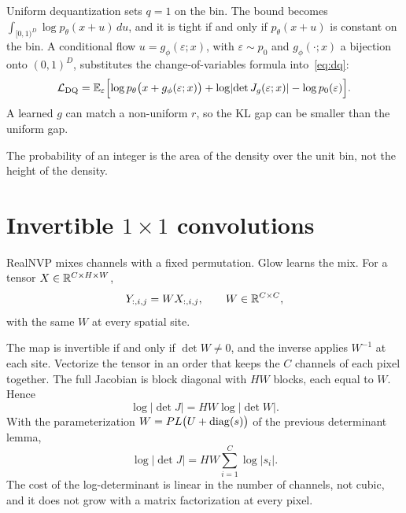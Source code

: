 Uniform dequantization sets $q=1$ on the bin. The bound becomes $\int_{[0,1)^D}\log p_\theta(x+u)\,du$, and it is tight if and only if $p_\theta(x+u)$ is constant on the bin. A conditional flow $u=g_\phi(\varepsilon;x)$, with $\varepsilon\sim p_0$ and $g_\phi(\cdot;x)$ a bijection onto $(0,1)^D$, substitutes the change-of-variables formula into~\eqref{eq:dq}:
\[
\mathcal L_{\mathrm{DQ}}
=\mathbb{E}_{\varepsilon}\Bigl[
\log p_\theta\bigl(x+g_\phi(\varepsilon;x)\bigr)
+\log\lvert\det J_{g}(\varepsilon;x)\rvert
-\log p_0(\varepsilon)
\Bigr].
\]
A learned $g$ can match a non-uniform $r$, so the KL gap can be smaller than the uniform gap.

\begin{center}
\end{center}
\begin{center}
\textcolor{muted}{\small The probability of an integer is the area of the density over the unit bin, not the height of the density.}
\end{center}

\section{Invertible $1\times 1$ convolutions}

RealNVP mixes channels with a fixed permutation. Glow learns the mix. For a tensor $X\in\mathbb{R}^{C\times H\times W}$,
\[
Y_{:,i,j}=W X_{:,i,j},\qquad W\in\mathbb{R}^{C\times C},
\]
with the same $W$ at every spatial site.

\begin{resultbox}
The map is invertible if and only if $\det W\neq 0$, and the inverse applies $W^{-1}$ at each site. Vectorize the tensor in an order that keeps the $C$ channels of each pixel together. The full Jacobian is block diagonal with $HW$ blocks, each equal to $W$. Hence
\[
\log\lvert\det J\rvert=HW\log\lvert\det W\rvert.
\]
With the parameterization $W=PL\bigl(U+\operatorname{diag}(s)\bigr)$ of the previous determinant lemma,
\[
\log\lvert\det J\rvert=HW\sum_{i=1}^{C}\log\lvert s_i\rvert.
\]
The cost of the log-determinant is linear in the number of channels, not cubic, and it does not grow with a matrix factorization at every pixel.
\end{resultbox}

